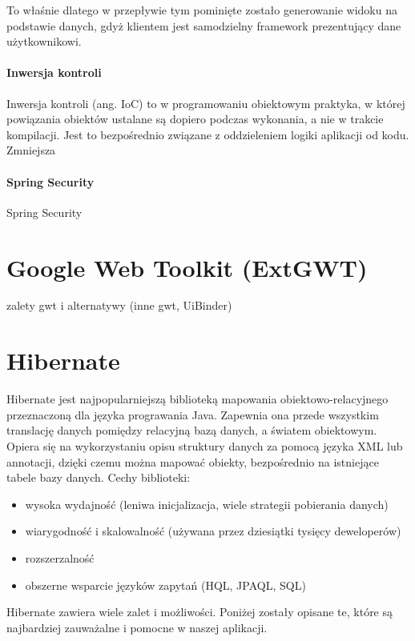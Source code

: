 \documentclass[licencjacka]{pracamgr}
\begin{document}
To właśnie dlatego w przepływie tym pominięte zostało generowanie widoku na podstawie danych, gdyż klientem jest samodzielny framework prezentujący dane użytkownikowi.

\paragraph{Inwersja kontroli}
Inwersja kontroli (ang. IoC) to w programowaniu obiektowym praktyka, w której powiązania obiektów ustalane są dopiero podczas wykonania, a nie w trakcie kompilacji. Jest to bezpośrednio związane z oddzieleniem logiki aplikacji od kodu. Zmniejsza 

\paragraph{Spring Security}

Spring Security

\section{Google Web Toolkit (ExtGWT)}
zalety gwt i alternatywy (inne gwt, UiBinder)
\section{Hibernate}
Hibernate jest najpopularniejszą biblioteką mapowania obiektowo-relacyjnego przeznaczoną dla języka prograwania Java.
Zapewnia ona przede wszystkim translację danych pomiędzy relacyjną bazą danych, a światem obiektowym. 
Opiera się na wykorzystaniu opisu struktury danych za pomocą języka XML lub annotacji, dzięki czemu można mapować obiekty, 
bezpośrednio na istniejące tabele bazy danych. Cechy biblioteki: 
\begin{itemize}
\item wysoka wydajność (leniwa inicjalizacja, wiele strategii pobierania danych)
\item wiarygodność i skalowalność (używana przez dziesiątki tysięcy deweloperów)
\item rozszerzalność
\item obszerne wsparcie języków zapytań (HQL, JPAQL, SQL) 
\end{itemize}
Hibernate zawiera wiele zalet i możliwości. Poniżej zostały opisane te, które 
są najbardziej zauważalne i pomocne w naszej aplikacji.
\end{document}
